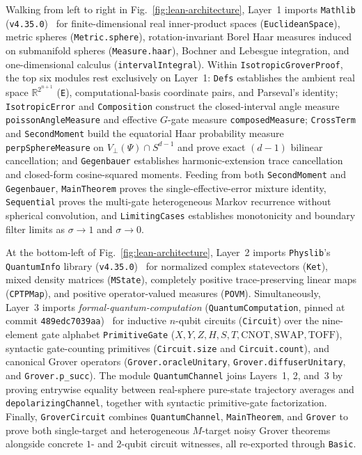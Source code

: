Walking from left to right in Fig.~\ref{fig:lean-architecture}, Layer~1 imports \texttt{Mathlib} (\texttt{v4.35.0})~\cite{Mathlib2020} for finite-dimensional real inner-product spaces (\texttt{EuclideanSpace}), metric spheres (\texttt{Metric.sphere}), rotation-invariant Borel Haar measures induced on submanifold spheres (\texttt{Measure.haar}), Bochner and Lebesgue integration, and one-dimensional calculus (\texttt{intervalIntegral}). Within \texttt{IsotropicGroverProof}, the top six modules rest exclusively on Layer~1: \texttt{Defs} establishes the ambient real space $\mathbb{R}^{2^{n+1}}$ (\texttt{E}), computational-basis coordinate pairs, and Parseval's identity; \texttt{IsotropicError} and \texttt{Composition} construct the closed-interval angle measure \texttt{poissonAngleMeasure} and effective $G$-gate measure \texttt{composedMeasure}; \texttt{CrossTerm} and \texttt{SecondMoment} build the equatorial Haar probability measure \texttt{perpSphereMeasure} on $V_\perp(\Psi) \cap S^{d-1}$ and prove exact $(d - 1)$ bilinear cancellation; and \texttt{Gegenbauer} establishes harmonic-extension trace cancellation and closed-form cosine-squared moments. Feeding from both \texttt{SecondMoment} and \texttt{Gegenbauer}, \texttt{MainTheorem} proves the single-effective-error mixture identity, \texttt{Sequential} proves the multi-gate heterogeneous Markov recurrence without spherical convolution, and \texttt{LimitingCases} establishes monotonicity and boundary filter limits as $\sigma \to 1$ and $\sigma \to 0$.

{\setlength{\emergencystretch}{3em}%
At the bottom-left of Fig.~\ref{fig:lean-architecture}, Layer~2 imports \texttt{Physlib}'s \texttt{QuantumInfo} library (\texttt{v4.35.0})~\cite{Meiburg2025} for normalized complex statevectors (\texttt{Ket}), mixed density matrices (\texttt{MState}), completely positive trace-preserving linear maps (\texttt{CPTPMap}), and positive operator-valued measures (\texttt{POVM}). Simultaneously, Layer~3 imports \emph{formal-quantum-computation} (\texttt{QuantumComputation}, pinned at commit \texttt{489edc7039aa})~\cite{Shirobokov2026} for inductive $n$-qubit circuits (\texttt{Circuit}) over the nine-element gate alphabet \texttt{PrimitiveGate} ($X, Y, Z, H, S, T, \mathrm{CNOT}, \mathrm{SWAP}, \mathrm{TOFF}$), syntactic gate-counting primitives (\texttt{Circuit.size} and \texttt{Circuit.count}), and canonical Grover operators (\texttt{Grover.oracleUnitary}, \texttt{Grover.diffuserUnitary}, and \texttt{Grover.p\_succ}). The module \texttt{QuantumChannel} joins Layers~1, 2, and~3 by proving entrywise equality between real-sphere pure-state trajectory averages and \texttt{depolarizingChannel}, together with syntactic primitive-gate factorization. Finally, \texttt{GroverCircuit} combines \texttt{QuantumChannel}, \texttt{MainTheorem}, and \texttt{Grover} to prove both single-target and heterogeneous $M$-target noisy Grover theorems alongside concrete $1$- and $2$-qubit circuit witnesses, all re-exported through \texttt{Basic}.\par}

